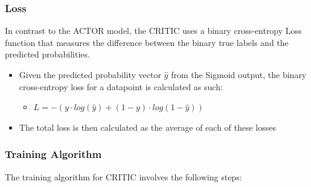 \documentclass[11pt]{article}
\begin{document}
\subsubsection{Loss}

In contrast to the ACTOR model, the CRITIC uses a binary cross-entropy Loss function that measures the difference between the binary true labels and the predicted probabilities.

\begin{itemize}
    \item Given the predicted probability vector $\hat{y}$ from the Sigmoid output, the binary cross-entropy loss for a datapoint is calculated as such:
    \begin{itemize}
        \item $L = - (y \cdot log(\hat{y}) + (1 - y) \cdot log(1 - \hat{y}))$
    \end{itemize}
    \item The total loss is then calculated as the average of each of these losses
\end{itemize}

\subsubsection{Training Algorithm}

The training algorithm for CRITIC involves the following steps:
\end{document}

